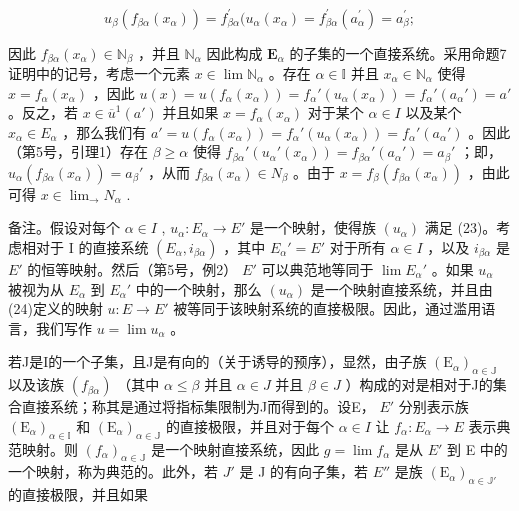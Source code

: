 \[
u _ {\beta} (f _ {\beta \alpha} (x _ {\alpha})) = f _ {\beta \alpha} ^ {\prime} (u _ {\alpha} (x _ {\alpha}) = f _ {\beta \alpha} ^ {\prime} (a _ {\alpha} ^ {\prime}) = a _ {\beta} ^ {\prime};
\]

因此 \(f_{\beta \alpha}(x_{\alpha}) \in \mathbb{N}_{\beta}\) ，并且 \(\mathbb{N}_{\alpha}\) 因此构成 \(\mathbf{E}_{\alpha}\) 的子集的一个直接系统。采用命题7证明中的记号，考虑一个元素 \(x \in \lim \mathbb{N}_{\alpha}\) 。存在 \(\alpha \in \mathbb{I}\) 并且 \(x_{\alpha} \in \mathbb{N}_{\alpha}\) 使得 \(x = f_{\alpha}(x_{\alpha})\) ，因此 \(u(x) = u(f_{\alpha}(x_{\alpha})) = f_{\alpha}'(u_{\alpha}(x_{\alpha})) = f_{\alpha}'(a_{\alpha}') = a'\) 。反之，若 \(x \in \overline{u}^1(a')\) 并且如果 \(x = f_\alpha(x_\alpha)\) 对于某个 \(\alpha \in I\) 以及某个 \(x_\alpha \in E_\alpha\) ，那么我们有 \(a' = u(f_\alpha(x_\alpha)) = f_\alpha'(u_\alpha(x_\alpha)) = f_\alpha'(a_\alpha')\) 。因此（第5号，引理1）存在 \(\beta \geqslant \alpha\) 使得 \(f_{\beta\alpha}'(u_\alpha'(x_\alpha)) = f_{\beta\alpha}'(a_\alpha') = a_\beta'\) ；即， \(u_\alpha(f_{\beta\alpha}(x_\alpha)) = a_\beta'\) ，从而 \(f_{\beta\alpha}(x_\alpha) \in N_\beta\) 。由于 \(x = f_\beta(f_{\beta\alpha}(x_\alpha))\) ，由此可得 \(x \in \lim_{\rightarrow} N_\alpha\) .

备注。假设对每个 \(\alpha \in I\) , \(u_{\alpha}: E_{\alpha} \to E'\) 是一个映射，使得族 \((u_{\alpha})\) 满足 (23)。考虑相对于 I 的直接系统 \((E_{\alpha}, i_{\beta \alpha})\) ，其中 \(E_{\alpha}' = E'\) 对于所有 \(\alpha \in I\) ，以及 \(i_{\beta \alpha}\) 是 \(E'\) 的恒等映射。然后（第5号，例2） \(E'\) 可以典范地等同于 \(\lim E_{\alpha}'\) 。如果 \(u_{\alpha}\) 被视为从 \(E_{\alpha}\) 到 \(E_{\alpha}'\) 中的一个映射，那么 \((u_{\alpha})\) 是一个映射直接系统，并且由(24)定义的映射 \(u: E \to E'\) 被等同于该映射系统的直接极限。因此，通过滥用语言，我们写作 \(u = \lim u_{\alpha}\) 。

若J是I的一个子集，且J是有向的（关于诱导的预序），显然，由子族 \((\mathrm{E}_{\alpha})_{\alpha\in\mathbb{J}}\) 以及该族 \((f_{\beta\alpha})\) （其中 \(\alpha\leqslant\beta\) 并且 \(\alpha\in J\) 并且 \(\beta\in J\) ）构成的对是相对于J的集合直接系统；称其是通过将指标集限制为J而得到的。设E， \(E'\) 分别表示族 \((\mathrm{E}_{\alpha})_{\alpha\in\mathbb{I}}\) 和 \((\mathrm{E}_{\alpha})_{\alpha\in\mathbb{J}}\) 的直接极限，并且对于每个 \(\alpha\in I\) 让 \(f_{\alpha}:E_{\alpha}\to E\) 表示典范映射。则 \((f_{\alpha})_{\alpha\in\mathbb{J}}\) 是一个映射直接系统，因此 \(g=\lim f_{\alpha}\) 是从 \(E'\) 到 E 中的一个映射，称为典范的。此外，若 \(J'\) 是 J 的有向子集，若 \(E''\) 是族 \((\mathrm{E}_{\alpha})_{\alpha\in\mathbb{J}'}\) 的直接极限，并且如果

